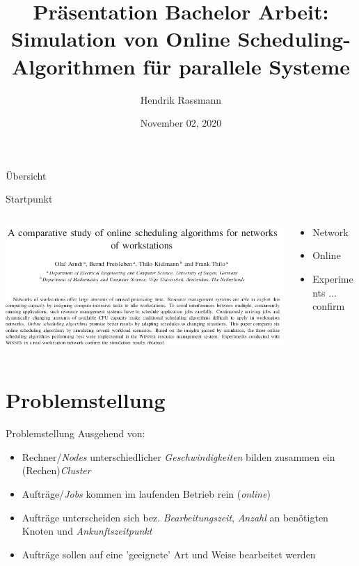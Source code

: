 \documentclass[aspectratio=169,10pt]{beamer}
\title{Pr\"asentation Bachelor Arbeit:\\
 Simulation von Online Scheduling-Algorithmen f\"ur parallele Systeme}
\author{Hendrik Rassmann}
\institute{TU Dortmund University - Department of Computer Science}
\date{November 02, 2020}
\begin{document}
\maketitle

\begin{frame}{\"Ubersicht}
\tableofcontents
\end{frame}


\begin{frame}[fragile]{Startpunkt}

\begin{columns}
	\begin{column}{0.57\paperwidth}
		\vspace{0.5pt}
		\includegraphics[width=\linewidth, clip]{images/Arndt}
	\end{column}
	\begin{column}[c]{0.43\paperwidth}
		\begin{itemize}
			\item \alert{Network}
			\item \alert{Online}
			\item \alert{Experiments} ... \alert{confirm}
		\end{itemize}
	\end{column}
\end{columns}
\end{frame}
\section{Problemstellung}


\begin{frame}[t,fragile]{Problemstellung}
Ausgehend von:

\begin{itemize}[<+->]
	\item Rechner/\emph{Nodes} unterschiedlicher \emph{Geschwindigkeiten} bilden zusammen ein (Rechen)\emph{Cluster} 
	\item Auftr\"age/\emph{Jobs} kommen im laufenden Betrieb rein (\emph{online})
	\item Auftr\"age unterscheiden sich bez. \emph{Bearbeitungszeit}, \emph{Anzahl} an ben\"otigten Knoten und \emph{Ankunftszeitpunkt}
	\item Auftr\"age sollen auf eine 'geeignete' Art und Weise bearbeitet werden
\end{itemize}
\end{frame}
\end{document}
